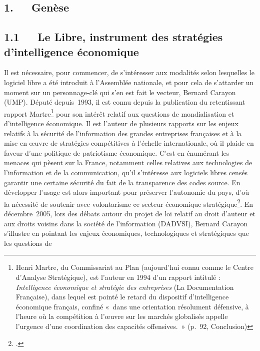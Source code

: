 \documentclass{FramateX}
\begin{document}
\begin{refsection}
\section*{1.~~~Genèse}
{}


\subsection*{1.1~~~Le Libre, instrument des stratégies d'intelligence économique}
{}

Il est nécessaire, pour commencer, de s'intéresser aux modalités selon
lesquelles le logiciel libre a été introduit à l'Assemblée nationale,
et pour cela de s'attarder un moment sur un personnage-clé qui s'en est
fait le vecteur, Bernard Carayon (UMP). Député depuis~1993, il est
connu depuis la publication du retentissant rapport
Martre\footnote{Henri Martre, du Commissariat au Plan (aujourd'hui
connu comme le Centre d'Analyse Stratégique), est l'auteur en 1994 d'un
rapport intitulé : \textit{Intelligence économique et stratégie des
entreprises} (La Documentation Française), dans lequel est pointé le
retard du dispositif d'intelligence économique français, confiné «~dans
une orientation résolument défensive, à l'heure où la compétition à
l'œuvre sur les marchés globalisés appelle l'urgence d'une coordination
des capacités offensives.~» (p.~92, Conclusion)} pour son intérêt
relatif aux questions de mondialisation et d'intelligence économique.
Il est l'auteur de plusieurs rapports sur les enjeux relatifs à la
sécurité de l'information des grandes entreprises françaises et à la
mise en œuvre de stratégies compétitives à l'échelle internationale, où
il plaide en faveur d'une politique de patriotisme économique. C'est en
énumérant les menaces qui pèsent sur la France, notamment celles
relatives aux technologies de l'information et de la communication,
qu'il s'intéresse aux logiciels libres censés garantir une certaine
sécurité du fait de la transparence des codes source. En développer
l'usage est alors important pour préserver l'autonomie du pays, d'où la
nécessité de soutenir avec volontarisme ce secteur économique
stratégique\footnote{\cite{callonpour2006}.}.
En décembre~2005, lors des débats autour du projet de loi relatif au
droit d'auteur et aux droits voisins dans la société de l'information
(DADVSI), Bernard Carayon s'illustre en pointant les enjeux
économiques, technologiques et stratégiques que les questions de

\end{refsection}
\end{document}
